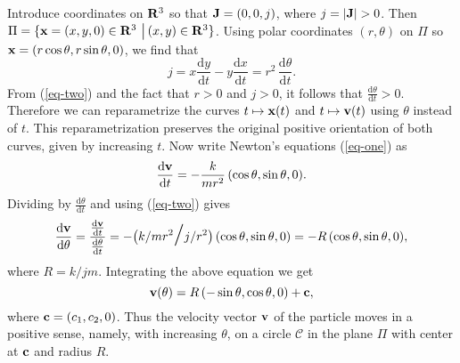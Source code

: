\documentclass[11pt,openbib]{article}
\newcommand{\dee}{\mathrm{d}}
\newcommand{\setrule}{\, \mathop{\rule[-4pt]{.5pt}{13pt}\, }\nolimits}
\begin{document}
\noindent Introduce coordinates on ${\bf R}^3$ so that ${\bf J} = (0,0,j)$, where $j = |{\bf J}| > 0$. Then 
$\Pi =\{ {\bf x} = (x,y,0) \in {\bf R}^3 \, \setrule \, (x,y) \in {\bf R}^3 \}$. Using polar coordinates $(r, \theta )$ on 
$\Pi $ so ${\bf x} = (r \cos \theta , r \sin \theta , 0)$, we find that 
\begin{equation}
j = x \frac{\dee y}{\dee t} - y \frac{\dee x}{\dee t} = r^2 \, \frac{\dee \theta }{\dee t}. 
\label{eq-two}
\end{equation}
From (\ref{eq-two}) and the fact that $r >0$ and $j >0$, it follows that $\frac{\dee \theta }{\dee t} >0$. Therefore 
we can reparametrize the curves $t \mapsto {\bf x}(t)$ and $t \mapsto {\bf v}(t)$ using $\theta $ instead of $t$. This reparametrization preserves the original positive orientation of both curves, given by increasing $t$. Now 
write Newton's equations (\ref{eq-one}) as 
\begin{displaymath}
\frac{\dee {\bf v}}{\dee t} = -\frac{k}{m r^2}\, ( \cos \theta , \sin \theta , 0).
\end{displaymath}
Dividing by $\frac{\dee \theta }{\dee t}$ and using (\ref{eq-two}) gives 
\begin{displaymath}
\frac{\dee {\bf v}}{\dee \theta } = \frac{\frac{\dee {\bf v}}{\dee t}}{\frac{\dee \theta }{\dee t}} = 
- \big( k/mr^2 \mbox{\LARGE $/$} j/r^2 \big) \, (\cos \theta , \sin \theta , 0) = - R \, (\cos \theta , \sin \theta , 0), 
\end{displaymath}
where $R = k/jm$. Integrating the above equation we get 
\begin{equation}
{\bf v}(\theta ) = R \, (-\sin \theta , \cos \theta , 0) + {\bf c}, 
\label{eq-three}
\end{equation}
where ${\bf c} = (c_1, c_2, 0)$. Thus the velocity vector ${\bf v}$ of the particle moves in a positive sense, namely, 
with increasing $\theta $, on a circle $\mathcal{C}$ in the plane $\Pi$ with center at ${\bf c}$ and radius $R$. 
\medskip  
\end{document}
